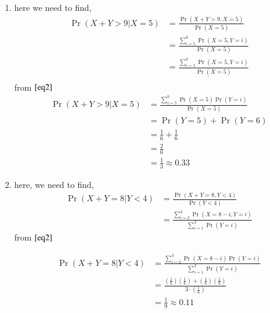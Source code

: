 \documentclass[journal,12pt,twocolumn]{IEEEtran}
\providecommand{\pr}[1]{\ensuremath{\Pr\left(#1\right)}}
\providecommand{\brak}[1]{\ensuremath{\left(#1\right)}}
\theoremstyle{remark}
\begin{document}
\begin{enumerate}[label=(\alph*)]
    \item here we need to find,
    \begin{align}
        \pr{X + Y> 9 | X = 5} &= \frac{\pr{X + Y> 9, X = 5}}{\pr{X = 5}}\\
                              &= \frac{\sum_{i = 5}^{6}\pr{X=5, Y = i}}{\pr{X = 5}}\\
                              &= \frac{\sum_{i = 5}^{6}\pr{X=5, Y = i}}{\pr{X = 5}}\\
    \end{align}
    from $\eqref{eq2}$
    \begin{align}
        \pr{X + Y> 9 | X = 5} &= \frac{\sum_{i = 5}^{6}\pr{X= 5}\pr{Y = i}}{\pr{X = 5}}   \\
                              &= \pr{Y= 5} + \pr{Y=6}\\
                              &= \frac{1}{6}+\frac{1}{6}\\
                              &= \frac{2}{6}\\
                              &= \frac{1}{3}\approx 0.33
                                \end{align}


\item here, we need to find,
\begin{align}
\pr{X + Y = 8 | Y < 4} &= \frac{\pr{X + Y = 8, Y < 4}}{\pr{Y < 4}}\\
                       &= \frac{\sum_{i = 2}^{3}\pr{X= 8 -i, Y = i}}{\sum_{i = 1}^{3}\pr{Y = i}}
\end{align}
from $\eqref{eq2}$

\begin{align}
    \pr{X + Y = 8 | Y < 4} &= \frac{\sum_{i = 2}^{3}\pr{X= 8 -i}\pr{ Y = i}}{\sum_{i = 1}^{3}\pr{Y = i}}\\
    &= \frac{\brak{\frac{1}{6}}\brak{\frac{1}{6}} + \brak{\frac{1}{6}}\brak{\frac{1}{6}}}{3\cdot\brak{\frac{1}{6}}}\\
    &= \frac{1}{9} \approx 0.11
\end{align}

\end{enumerate}
\end{document}
